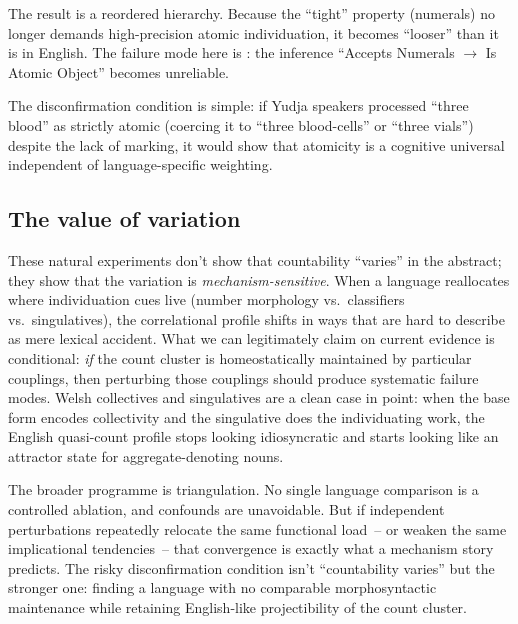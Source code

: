 The result is a reordered hierarchy. Because the \enquote{tight} property (numerals) no longer demands high-precision atomic individuation, it becomes \enquote{looser} than it is in English. The failure mode here is : the inference \enquote{Accepts Numerals $\to$ Is Atomic Object} becomes unreliable.

The disconfirmation condition is simple: if Yudja speakers processed \enquote{three blood} as strictly atomic (coercing it to \enquote{three blood-cells} or \enquote{three vials}) despite the lack of marking, it would show that atomicity is a cognitive universal independent of language-specific weighting.

\subsection{The value of variation}
\label{sec:9:value-variation}

These natural experiments don't show that countability \enquote{varies} in the abstract; they show that the variation is \emph{mechanism-sensitive}. When a language reallocates where individuation cues live (number morphology vs.\ classifiers vs.\ singulatives), the correlational profile shifts in ways that are hard to describe as mere lexical accident. What we can legitimately claim on current evidence is conditional: \emph{if} the count cluster is homeostatically maintained by particular couplings, then perturbing those couplings should produce systematic failure modes. Welsh collectives and singulatives are a clean case in point: when the base form encodes collectivity and the singulative does the individuating work, the English quasi-count profile stops looking idiosyncratic and starts looking like an attractor state for aggregate-denoting nouns.

The broader programme is triangulation. No single language comparison is a controlled ablation, and confounds are unavoidable. But if independent perturbations repeatedly relocate the same functional load~-- or weaken the same implicational tendencies~-- that convergence is exactly what a mechanism story predicts. The risky disconfirmation condition isn't \enquote{countability varies} but the stronger one: finding a language with no comparable morphosyntactic maintenance while retaining English-like projectibility of the count cluster.

